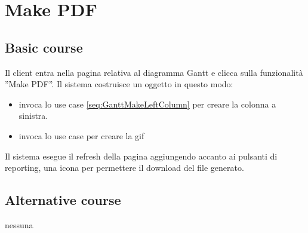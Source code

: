 \section{Make PDF}
\label{seq:GanttMakePDF}
\subsection{Basic course}
Il client entra nella pagina relativa al diagramma Gantt e clicca sulla 
funzionalit\`a ''Make PDF''. Il sistema costruisce un oggetto in questo modo:
\begin{itemize}
  \item invoca lo use case \ref{seq:GanttMakeLeftColumn} per creare la
  colonna a sinistra.
  \item invoca lo use case per creare la gif 
\end{itemize}
Il sistema esegue il refresh della pagina aggiungendo accanto ai pulsanti di
reporting, una icona per permettere il download del file generato.  

\subsection{Alternative course}
\begin{description}
\item[nessuna]
\end{description}